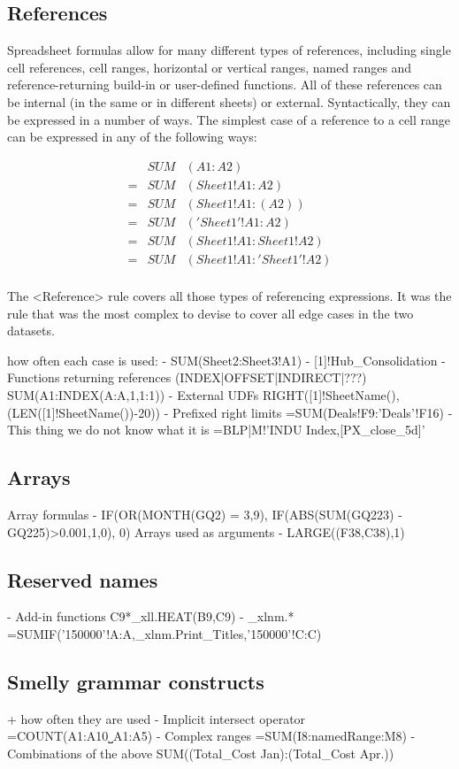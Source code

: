 \documentclass[conference]{IEEEtran}
\begin{document}
\subsection{References}
 
Spreadsheet formulas allow for many different types of references, including single cell references, cell ranges, horizontal or vertical ranges, named ranges and reference-returning build-in or user-defined functions. All of these references can be internal (in the same or in different sheets) or external. Syntactically, they can be expressed in a number of ways. The simplest case of a reference to a cell range can be expressed in any of the following ways:

\begin{eqnarray*}
&SUM&(A1:A2) \\
= &SUM&(Sheet1!A1:A2) \\
= &SUM&(Sheet1!A1:(A2)) \\
= &SUM&('Sheet1'!A1:A2) \\
= &SUM&(Sheet1!A1:Sheet1!A2) \\
= &SUM&(Sheet1!A1:'Sheet1'!A2) \\
\end{eqnarray*}

The <Reference> rule covers all those types of referencing expressions. It was the rule that was the most complex to devise to cover all edge cases in the two datasets.
 
how often each case is used:
- SUM(Sheet2:Sheet3!A1)
- [1]!Hub\_Consolidation
- Functions returning references (INDEX|OFFSET|INDIRECT|???) SUM(A1:INDEX(A:A,1,1:1))
- External UDFs RIGHT([1]!SheetName(),(LEN([1]!SheetName())-20))
- Prefixed right limits =SUM(Deals!F9:'Deals'!F16)
- This thing we do not know what it is =BLP|M!'INDU Index,[PX\_close\_5d]'

\subsection{Arrays}
Array formulas
- IF(OR(MONTH(GQ2) = {3,9}), IF(ABS(SUM(GQ223) - GQ225)>0.001,1,0), 0)
Arrays used as arguments
- LARGE((F38,C38),1)

\subsection{Reserved names}
- Add-in functions C9*\_xll.HEAT(B9,C9)
- \_xlnm.* =SUMIF('150000'!A:A,\_xlnm.Print\_Titles,'150000'!C:C)


\subsection{Smelly grammar constructs}
 + how often they are used
- Implicit intersect operator =COUNT(A1:A10˽A1:A5)
- Complex ranges =SUM(I8:namedRange:M8)
- Combinations of the above SUM((Total\_Cost Jan):(Total\_Cost Apr.))
\end{document}

